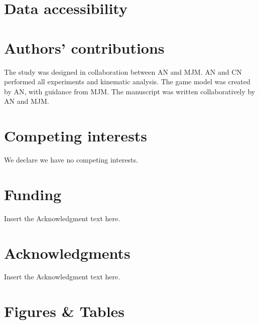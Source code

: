 \documentclass[]{rsos}%
\begin{document}
\section*{Data accessibility}


\section*{Authors' contributions}
The study was designed in collaboration between AN and MJM.
AN and CN performed all experiments and kinematic analysis.
The game model was created by AN, with guidance from MJM. 
The manuscript was written collaboratively by AN and MJM.

\section*{Competing interests}
We declare we have no competing interests.

\section*{Funding}
Insert the Acknowledgment text here.

\section*{Acknowledgments}
Insert the Acknowledgment text here.




\linespread{1}\selectfont %



\pagebreak



\section*{Figures \& Tables}

\linespread{1.3}\selectfont %
\end{document}

